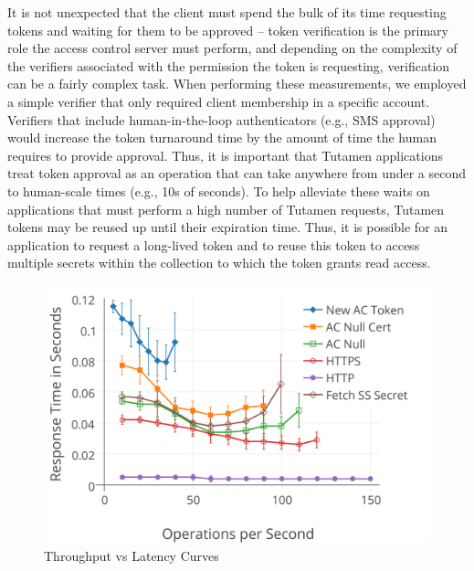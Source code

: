 It is not unexpected that the client must spend the bulk of its time
requesting tokens and waiting for them to be approved -- token
verification is the primary role the access control server must
perform, and depending on the complexity of the verifiers associated
with the permission the token is requesting, verification can be a
fairly complex task. When performing these measurements, we employed a
simple verifier that only required client membership in a specific
account. Verifiers that include human-in-the-loop authenticators
(e.g., SMS approval) would increase the token turnaround time by the
amount of time the human requires to provide approval. Thus, it is
important that Tutamen applications treat token approval as an
operation that can take anywhere from under a second to human-scale
times (e.g., 10s of seconds). To help alleviate these waits on
applications that must perform a high number of Tutamen requests,
Tutamen tokens may be reused up until their expiration time. Thus, it
is possible for an application to request a long-lived token and to
reuse this token to access multiple secrets within the collection to
which the token grants read access.
 
\begin{figure}[th]
  \centering
  \includegraphics[width=\columnwidth]{./figs/png/chart-iops.png}
  \caption{Throughput vs Latency Curves}
  \label{fig:eval:iops}
\end{figure}

